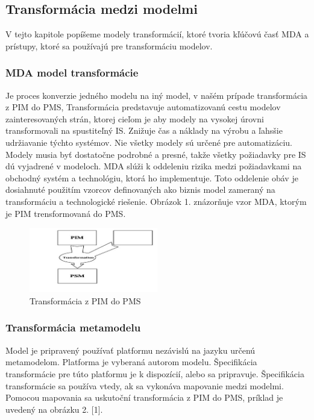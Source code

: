 \documentclass[a4paper]{feidippp}
\begin{document}
\subsection{Transformácia medzi modelmi }

V tejto kapitole popíšeme modely transformácií, ktoré tvoria kľúčovú časť MDA a prístupy, ktoré sa používajú pre transformáciu modelov.

\subsubsection{		 MDA model transformácie }  
 Je proces konverzie jedného modelu na iný model, v našém prípade transformácia z PIM do PMS, Transformácia predstavuje automatizovanú cestu modelov zainteresovaných strán, ktorej cieľom je aby modely na vysokej úrovni transformovali na spustiteľný IS. Znižuje čas a náklady na výrobu a ľahsšie udržiavanie týchto systémov. Nie všetky modely sú určené pre automatizáciu. Modely musia byť dostatočne podrobné a presné, takže všetky požiadavky pre IS dú vyjadrené v modeloch.
MDA slúži k oddeleniu rizika medzi požiadavkami na obchodný systém a technológiu, ktorá ho implementuje. Toto oddelenie obáv je dosiahnuté použitím vzorcov definovaných ako biznis model zameraný na transformáciu a technologické riešenie. 
Obrázok 1. znázorňuje vzor MDA, ktorým je PIM trensformovaná do PMS.




\begin{figure}[!ht]
\centering 
\includegraphics[width=0.5\textwidth]{dp1.jpg}
\caption{ Transformácia  z PIM do PMS}\label{o:1}
\end{figure}


\subsubsection{	Transformácia metamodelu }

Model je pripravený používať platformu nezávislú na jazyku určenú metamodelom. Platforma je vyberaná autorom modelu. Špecifikácia transformácie pre túto platformu je k dispozícií, alebo sa pripravuje. Špecifikácia transformácie sa používa vtedy, ak sa vykonáva mapovanie medzi modelmi. Pomocou mapovania sa uskutoční transformácia z PIM do PMS, príklad je uvedený na obrázku 2. [1].
\end{document}
